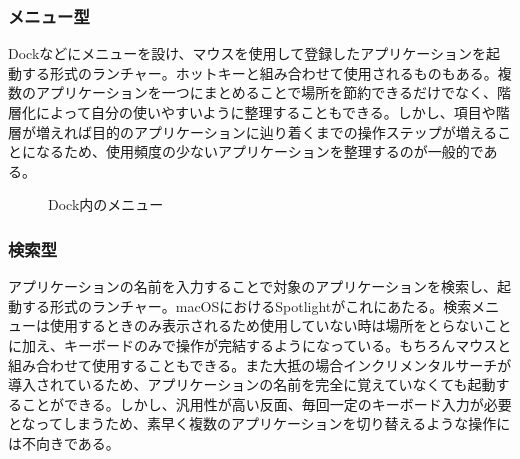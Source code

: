\subsubsection{メニュー型}

Dockなどにメニューを設け、マウスを使用して登録したアプリケーションを起動する形式のランチャー。ホットキーと組み合わせて使用されるものもある。複数のアプリケーションを一つにまとめることで場所を節約できるだけでなく、階層化によって自分の使いやすいように整理することもできる。しかし、項目や階層が増えれば目的のアプリケーションに辿り着くまでの操作ステップが増えることになるため、使用頻度の少ないアプリケーションを整理するのが一般的である。

\newpage

\begin{figure}[h]
    \begin{center}
    \end{center}
    \caption{Dock内のメニュー}
    \label{fig:menu}
\end{figure}

\subsubsection{検索型}

アプリケーションの名前を入力することで対象のアプリケーションを検索し、起動する形式のランチャー。macOSにおけるSpotlightがこれにあたる。検索メニューは使用するときのみ表示されるため使用していない時は場所をとらないことに加え、キーボードのみで操作が完結するようになっている。もちろんマウスと組み合わせて使用することもできる。また大抵の場合インクリメンタルサーチが導入されているため、アプリケーションの名前を完全に覚えていなくても起動することができる。しかし、汎用性が高い反面、毎回一定のキーボード入力が必要となってしまうため、素早く複数のアプリケーションを切り替えるような操作には不向きである。

